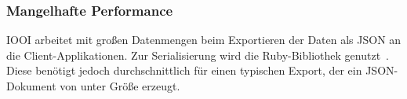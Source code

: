 \subsubsection{Mangelhafte Performance}
\label{sssec:epv_ungenuegende_performance}

IOOI arbeitet mit großen Datenmengen beim Exportieren der Daten als JSON an die
Client-Applikationen.  Zur Serialisierung wird die Ruby-Bibliothek
 genutzt~\cite{ams}.  Diese benötigt jedoch
durchschnittlich  für einen typischen Export, der ein JSON-Dokument von
unter  Größe erzeugt.
